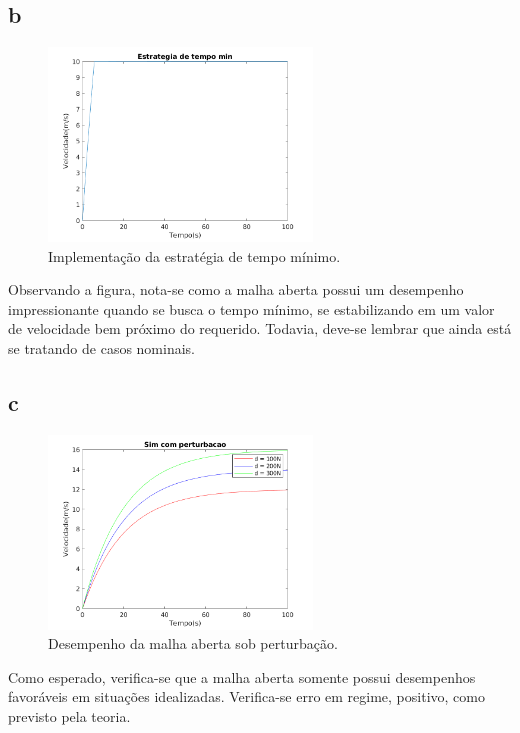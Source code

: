 \documentclass{article}[twocolumn]
\begin{document}
	\subsection{b}
	\begin{figure}[H]
		\centering
		\includegraphics[width=7cm]{2b.png}
		\caption{Implementa\c{c}\~ao da estrat\'egia de tempo m\'inimo.}
	\end{figure}
	Observando a figura, nota-se como a malha aberta possui um desempenho impressionante
	quando se busca o tempo m\'inimo, se estabilizando em um valor de velocidade bem pr\'oximo
	do requerido. Todavia, deve-se lembrar que ainda est\'a se tratando de casos nominais.
	\subsection{c}
	\begin{figure}[H]
		\centering
		\includegraphics[width=7cm]{2c.png}
		\caption{Desempenho da malha aberta sob perturba\c{c}\~ao.}
	\end{figure}
	Como esperado, verifica-se que a malha aberta somente possui desempenhos favor\'aveis
	em situa\c{c}\~oes idealizadas. Verifica-se erro em regime, positivo, como previsto
	pela teoria.
\end{document}
